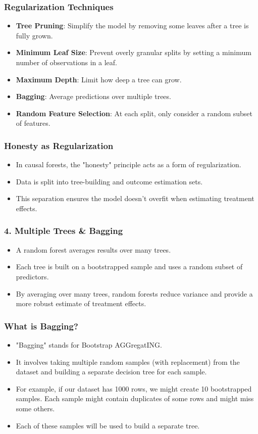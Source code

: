 \documentclass{beamer}
\begin{document}
\begin{frame}
\frametitle{Regularization Techniques}
\begin{itemize}
\item \textbf{Tree Pruning}: Simplify the model by removing some leaves after a tree is fully grown.
\item \textbf{Minimum Leaf Size}: Prevent overly granular splits by setting a minimum number of observations in a leaf.
\item \textbf{Maximum Depth}: Limit how deep a tree can grow.
\item \textbf{Bagging}: Average predictions over multiple trees.
\item \textbf{Random Feature Selection}: At each split, only consider a random subset of features.
\end{itemize}
\end{frame}

\begin{frame}
\frametitle{Honesty as Regularization}
\begin{itemize}
\item In causal forests, the "honesty" principle acts as a form of regularization.
\item Data is split into tree-building and outcome estimation sets.
\item This separation ensures the model doesn't overfit when estimating treatment effects.
\end{itemize}
\end{frame}



\begin{frame}
\frametitle{4. Multiple Trees \& Bagging}
\begin{itemize}
\item A random forest averages results over many trees.
\item Each tree is built on a bootstrapped sample and uses a random subset of predictors.
\item By averaging over many trees, random forests reduce variance and provide a more robust estimate of treatment effects.
\end{itemize}
\end{frame}


\begin{frame}
\frametitle{What is Bagging?}
\begin{itemize}
\item "Bagging" stands for Bootstrap AGGregatING.
\item It involves taking multiple random samples (with replacement) from the dataset and building a separate decision tree for each sample.
\item For example, if our dataset has 1000 rows, we might create 10 bootstrapped samples. Each sample might contain duplicates of some rows and might miss some others.
\item Each of these samples will be used to build a separate tree.
\end{itemize}
\end{frame}
\end{document}
